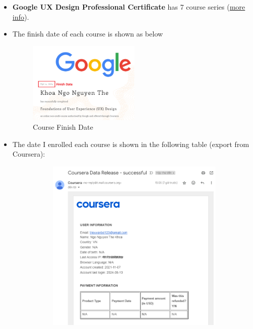 \begin{itemize}
	\item \textbf{Google UX Design Professional Certificate} has 7 course series (\href{https://www.coursera.org/professional-certificates/google-ux-design}{more info}).
	\item The finish date of each course is shown as below
	      \begin{figure}[!ht]
		      \centering
		      \includegraphics[width=0.5\textwidth]{imgs/FinishDay.png}
		      \caption{Course Finish Date}\label{fig:finish_date}
	      \end{figure}
	\item The date I enrolled each course is shown in the following table (export from Coursera):
	      \begin{figure}[!ht]
		      \centering
		      \begin{subfigure}{0.45\textwidth}
			      \centering
			      \includegraphics[width=\textwidth]{imgs/data-release-p1.png}

\end{subfigure}
\end{figure}
\end{itemize}
